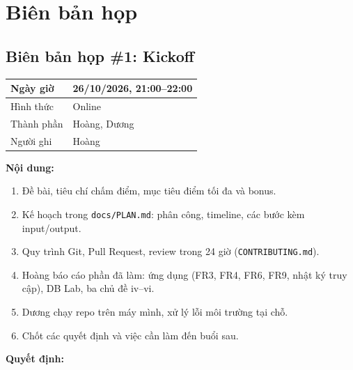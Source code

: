 \section{Biên bản họp}
\label{app:meetings}

\subsection*{Biên bản họp \#1: Kickoff}

\begin{table}[H]
\centering
\begin{tabularx}{\linewidth}{|p{3cm}|X|}
\hline
Ngày giờ & 26/10/2026, 21:00--22:00 \\ \hline
Hình thức & Online \\ \hline
Thành phần & Hoàng, Dương \\ \hline
Người ghi & Hoàng \\ \hline
\end{tabularx}
\end{table}

\textbf{Nội dung:}
\begin{enumerate}
    \item Đề bài, tiêu chí chấm điểm, mục tiêu điểm tối đa và bonus.
    \item Kế hoạch trong \texttt{docs/PLAN.md}: phân công, timeline, các bước kèm input/output.
    \item Quy trình Git, Pull Request, review trong 24 giờ (\texttt{CONTRIBUTING.md}).
    \item Hoàng báo cáo phần đã làm: ứng dụng (FR3, FR4, FR6, FR9, nhật ký truy cập), DB Lab, ba chủ đề iv--vi.
    \item Dương chạy repo trên máy mình, xử lý lỗi môi trường tại chỗ.
    \item Chốt các quyết định và việc cần làm đến buổi sau.
\end{enumerate}

\textbf{Quyết định:}

